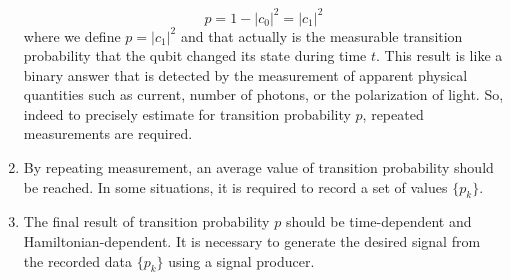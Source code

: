 \documentclass[11pt]{article}
\begin{document}
\begin{enumerate}
\begin{equation}
				p = 1-|c_0|^2 = |c_1|^2
			\end{equation}
		where we define $p = |c_1|^2$ and that actually is the measurable transition probability that the qubit changed its state during time $t$. This result is like a binary answer that is detected by the measurement of apparent physical quantities such as current, number of photons, or the polarization of light. So, indeed to precisely estimate for transition probability $p$, repeated measurements are required.  
		\item By repeating measurement, an average value of transition probability should be reached. In some situations, it is required to record a set of values $\{p_k\}$.
		\item The final result of transition probability $p$ should be time-dependent and Hamiltonian-dependent. It is necessary to generate the desired signal from the recorded data $\{p_k\}$ using a signal producer.
	\end{enumerate}
\end{document}
